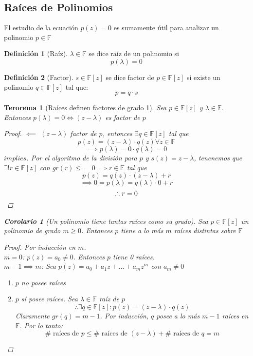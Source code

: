 \documentclass[11pt]{book}
\newtheorem{thm}{Terorema}[section]
\newtheorem*{cor}{Corolario}
\theoremstyle{definition}
\newtheorem{defn}{Definición}[section]
\begin{document}
\subsection{Raíces de Polinomios}
El estudio de la ecuación $p(z)=0$ es sumamente útil para analizar un polinomio $p\in\mathbb{F}$
\begin{defn}[Raíz]
$\lambda\in\mathbb{F}$ se dice raiz de un polinomio si
\[p(\lambda)=0\]
\end{defn}
\begin{defn}[Factor]
$s\in\mathbb{F}[z]$ se dice factor de $p\in\mathbb{F}[z]$ si existe un polinomio $q\in\mathbb{F}[z]$ tal que:
\[p=q\cdot s\]
\end{defn}
\begin{thm}[Raíces definen factores de grado 1]
Sea $p\in\mathbb{F}[z]$ y $\lambda\in\mathbb{F}$. Entonces $p(\lambda)=0\iff(z-\lambda)$ es factor de $p$
\begin{proof}
$\impliedby$ $(z-\lambda)$ factor de $p$, entonces $\exists q\in\mathbb{F}[z]$ tal que
\[p(z)=(z-\lambda)\cdot q(z)\forall z\in\mathbb{F}\]
\[\implies p(\lambda)=0\cdot q(\lambda)=0\]
$implies$. Por el algoritmo de la división para $p$ y $s(z)=z-\lambda$, tenenemos que $\exists !r\in\mathbb{F}[z]$ con $gr(r)\leq=0\implies r\in\mathbb{F}$ tal que 
\[p(z)=q(z)\cdot (z-\lambda)+r\]
\[\implies 0=p(\lambda)=q(\lambda)\cdot 0+r\]
\[\therefore r=0\qedhere\]
\end{proof}
\begin{cor}[Un polinomio tiene tantas raíces como su grado]
Sea $p\in\mathbb{F}[z]$ un polinomio de grado $m\geq 0$. Entonces $p$ tiene a lo más $m$ raíces distintas sobre $\mathbb{F}$
\begin{proof}
Por inducción en $m$.\\
$m=0$: $p(z)=a_0\neq 0$. Entonces $p$ tiene 0 raíces.\\
$m-1\implies m$: Sea $p(z)=a_0+a_1z+...+a_mz^m$ con $a_m\neq 0$
\begin{enumerate}[label= \underline{Caso \arabic*}:]
	\item $p$ no posee raíces
	
	\item $p$ sí posee raíces. Sea $\lambda\in\mathbb{F}$ raíz de $p$
	\[\therefore \exists q\in\mathbb{F}[z]: p(z)=(z-\lambda)\cdot q(z)\]
	Claramente $gr(q)=m-1$. Por inducción, $q$ posee a lo más $m-1$ raíces en $\mathbb{F}$. Por lo tanto:
	\[\#\textrm{ raíces de }p\leq \#\textrm{ raíces de }(z-\lambda)+\#\textrm{ raíces de }q=m\]
\end{enumerate}
\end{proof}
\end{cor}
\end{thm}
\end{document}
